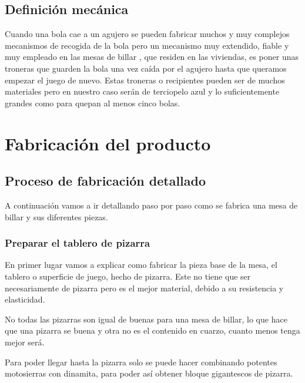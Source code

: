 	\subsection {Definición mecánica}
		    Cuando una bola cae a un agujero se pueden fabricar muchos y muy complejos mecanismos de recogida de la bola pero un mecanismo muy extendido,
		    fiable y muy empleado en las mesas de billar , que residen en las viviendas, es poner unas troneras que guarden la bola una vez caída por el agujero hasta que queramos empezar
		    el juego de nuevo. Estas troneras o recipientes pueden ser de muchos materiales pero en nuestro caso serán de terciopelo azul  y lo suficientemente grandes como para quepan al menos cinco  bolas. 

\clearpage
\section {Fabricación del producto}

	\subsection {Proceso de fabricación detallado}
		A  continuación vamos a  ir detallando paso por paso como se fabrica una mesa de billar y sus diferentes piezas.
		
		\subsubsection {Preparar el tablero de pizarra}
			En primer lugar vamos a explicar como fabricar la pieza base de la mesa, el tablero o superficie de juego, hecho de pizarra. Este no tiene que ser necesariamente de pizarra pero es el mejor material, debido a  su resistencia y elasticidad.

 No todas las pizarras son igual de buenas para una mesa de billar, lo que hace que una pizarra se buena y otra no es el contenido en cuarzo, cuanto menos tenga mejor será.

Para poder llegar hasta la pizarra solo se puede hacer combinando potentes motosierras con dinamita, para poder así obtener bloque gigantescos de pizarra.

